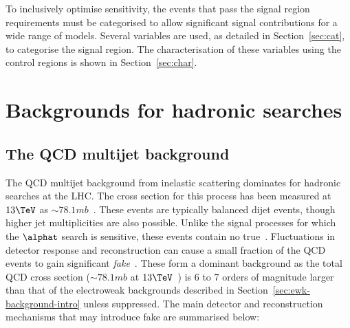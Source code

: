 To inclusively optimise sensitivity, the events that pass the signal region requirements 
must be categorised to allow significant signal contributions for a wide range of models. 
Several variables are used, as detailed in Section~\ref{sec:cat}, to categorise the signal region. 
The characterisation of these variables using the control
regions is shown in Section~\ref{sec:char}.

\section{Backgrounds for hadronic searches}
\subsection{The QCD multijet background}
\label{sec:qcd-background-intro}
The QCD multijet background from inelastic scattering dominates for hadronic searches at the LHC. 
The cross section for this process has been measured at $13\TeV$ as $\sim78.1mb$~\cite{inelast}. These events
are typically balanced dijet events, though higher jet multiplicities are also possible. 
Unlike the signal processes for which the $\alphat$ search is sensitive, these events contain
no true~\met. Fluctuations in detector response and reconstruction can cause a small fraction 
of the QCD events to gain significant \emph{fake}~\met. These form a dominant background as 
the total QCD cross section ($\sim78.1mb$ at $13\TeV$~\cite{inelast})
is 6 to 7 orders of magnitude larger than that of the electroweak backgrounds described in
 Section~\ref{sec:ewk-background-intro} unless suppressed. 
The main detector and reconstruction mechanisms that may introduce fake \met are summarised below:


